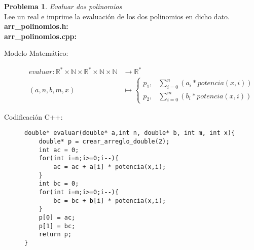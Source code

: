 \documentclass{article}
\theoremstyle{plain}
\theoremstyle{definition}
\newtheorem{problem}{Problema}
\begin{document}
\begin{problem} \emph{Evaluar dos polinomios}\\
Lee un real e imprime la evaluación de los dos polinomios en dicho dato.\\
\textbf{arr\_polinomios.h:}\ \\
\textbf{arr\_polinomios.cpp:}\ 
%
\begin{description}
\item[Modelo Matemático:]
%
\begin{align*}
evaluar: \mathbb{R}^*\times\mathbb{N}\times\mathbb{R}^*\times\mathbb{N}\times\mathbb{N} &\to \mathbb{R}^*\\
(a,n,b,m,x) &\mapsto 
\begin{cases}
p_1,& \sum_{i=0}^{n} (a_i * potencia(x,i))\\
p_2,& \sum_{i=0}^{m} (b_i * potencia(x,i))
\end{cases}
\end{align*}
%
\item[Codificación \textsf{C++}:]\hfill
%
\begin{verbatim}
double* evaluar(double* a,int n, double* b, int m, int x){
    double* p = crear_arreglo_double(2);
    int ac = 0;
    for(int i=n;i>=0;i--){
        ac = ac + a[i] * potencia(x,i);
    }
    int bc = 0;
    for(int i=m;i>=0;i--){
        bc = bc + b[i] * potencia(x,i);
    }
    p[0] = ac;
    p[1] = bc;
    return p;
}
\end{verbatim}
\end{description}
\end{problem}
\end{document}
